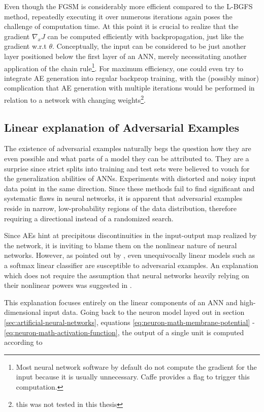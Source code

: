 \documentclass[11pt, a4paper]{article}
\begin{document}
Even though the FGSM is considerably more efficient compared to the L-BGFS method, repeatedly executing it over numerous iterations again poses the challenge of computation time. At this point it is crucial to realize that the gradient $\nabla_x J$ can be computed efficiently with backpropagation, just like the gradient w.r.t $\theta$. Conceptually, the input can be considered to be just another layer positioned below the first layer of an ANN, merely necessitating another application of the chain rule\footnote{Most neural network software by default do not compute the gradient for the input because it is usually unnecessary. Caffe provides a flag to trigger this computation.}. For maximum efficiency, one could even try to integrate AE generation into regular backprop training, with the (possibly minor) complication that AE generation with multiple iterations would be performed in relation to a network with changing weights\footnote{this was not tested in this thesis}.

\subsection{Linear explanation of Adversarial Examples}
\label{subsec:ae-linear-explanation}
The existence of adversarial examples naturally begs the question how they are even possible and what parts of a model they can be attributed to. They are a surprise since strict splits into training and test sets were believed to vouch for the generalization abilities of ANNs. Experiments with distorted and noisy input data point in the same direction. Since these methods fail to find significant and systematic flaws in neural networks, it is apparent that adversarial examples reside in narrow, low-probability regions of the data distribution, therefore requiring a directional instead of a randomized search.

Since AEs hint at precipitous discontinuities in the input-output map realized by the network, it is inviting to blame them on the nonlinear nature of neural networks. However, as pointed out by \cite{intriguing-properties-of-neural-networks}, even unequivocally linear models such as a softmax linear classifier are susceptible to adversarial examples. An explanation which does not require the assumption that neural networks heavily relying on their nonlinear powers was suggested in \cite{explaining-and-harnessing-adversarial-examples}.

This explanation focuses entirely on the linear components of an ANN and high-dimensional input data. Going back to the neuron model layed out in section \ref{sec:artificial-neural-networks}, equations \eqref{eq:neuron-math-membrane-potential} - \eqref{eq:neuron-math-activation-function}, the output of a single unit is computed according to
\end{document}
